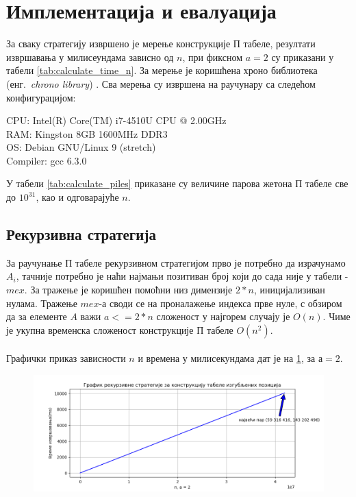 \documentclass[a4paper]{article}
\begin{document}
\section{Имплементација и евалуација}
\label{implementacija_evaluacija}

За сваку стратегију извршено је мерење конструкције П табеле, резултати извршавања у милисеундама зависно од $ n $, при фиксном $ a = 2 $ су приказани у табели \ref{tab:calculate_time_n}. 
За мерење је коришћена хроно библиотека (енг.{~\em chrono library}) \cite{chrono_library}. Сва мерења су извршена на раучунару са следећом конфигурацијом:
\begin{flushleft}
	CPU: Intel(R) Core(TM) i7-4510U CPU @ 2.00GHz\\
	RAM: Kingston 8GB 1600MHz DDR3\\
	OS: Debian GNU/Linux 9 (stretch)\\
	Compiler: gcc 6.3.0\\
\end{flushleft}

У табели \ref{tab:calculate_piles} приказане су величине парова жетона П табеле све до $ 10^{31} $, као и одговарајуће $ n $.

\subsection{Рекурзивна стратегија}

За раучунање П табеле рекурзивном стратегијом прво је потребно да израчунамо $ A_{i} $, тачније потребно је наћи најмањи позитиван број који до сада није у табели - $ mex $. За тражење је коришћен помоћни низ димензије $ 2*n $, иницијализиван нулама. Тражење $ mex $-а  своди се на проналажење индекса прве нуле, с обзиром да за елементе $ A $ важи $ a <= 2*n $ сложеност у најгорем случају је $ O(n) $. Чиме је укупна временска сложеност конструкције П табеле $ O(n^2) $.\\



\leavevmode\\
Графички приказ зависности $ n $ и времена у милисекундама дат је на \ref{fig:recursive}, за $ а = 2 $.

\begin{figure}[H]
	\label{fig:recursive}
	\centering
	\includegraphics[width=\textwidth]{recursive.png}
\end{figure}
\end{document}
